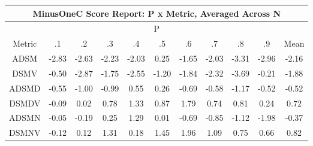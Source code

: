 \begin{longtable}{ | c || c | c | c | c | c | c | c | c | c || c |}
\hline
\multicolumn{11}{|c|}{ MinusOneC Score Report: P x Metric, Averaged Across N } \\
\hline
\multicolumn{11}{|c|}{ P } \\
\hline
Metric & .1 & .2 & .3 & .4 & .5 & .6 & .7 & .8 & .9 & Mean\\
\hline
\hline
\endhead
ADSM &  \cellcolor[HTML]{FFB7B7} -2.83 &  \cellcolor[HTML]{FFBFBF} -2.63 &  \cellcolor[HTML]{FFC7C7} -2.23 &  \cellcolor[HTML]{FFCFCF} -2.03 &  \cellcolor[HTML]{F7F7FF} 0.25 &  \cellcolor[HTML]{FFD7D7} -1.65 &  \cellcolor[HTML]{FFCFCF} -2.03 &  \cellcolor[HTML]{FFAFAF} -3.31 &  \cellcolor[HTML]{FFB7B7} -2.96 &  \cellcolor[HTML]{FFC7C7} -2.16 \\
DSMV &  \cellcolor[HTML]{FFEFEF} -0.50 &  \cellcolor[HTML]{FFB7B7} -2.87 &  \cellcolor[HTML]{FFCFCF} -1.75 &  \cellcolor[HTML]{FFBFBF} -2.55 &  \cellcolor[HTML]{FFDFDF} -1.20 &  \cellcolor[HTML]{FFCFCF} -1.84 &  \cellcolor[HTML]{FFC7C7} -2.32 &  \cellcolor[HTML]{FF9F9F} -3.69 &  \cellcolor[HTML]{FFF7F7} -0.21 &  \cellcolor[HTML]{FFCFCF} -1.88 \\
ADSMD &  \cellcolor[HTML]{FFEFEF} -0.55 &  \cellcolor[HTML]{FFE7E7} -1.00 &  \cellcolor[HTML]{FFE7E7} -0.99 &  \cellcolor[HTML]{EFEFFF} 0.55 &  \cellcolor[HTML]{F7F7FF} 0.26 &  \cellcolor[HTML]{FFEFEF} -0.69 &  \cellcolor[HTML]{FFEFEF} -0.58 &  \cellcolor[HTML]{FFDFDF} -1.17 &  \cellcolor[HTML]{FFEFEF} -0.52 &  \cellcolor[HTML]{FFEFEF} -0.52 \\
DSMDV &  \cellcolor[HTML]{FFFFFF} -0.09 &  \cellcolor[HTML]{FFFFFF} 0.02 &  \cellcolor[HTML]{EFEFFF} 0.78 &  \cellcolor[HTML]{DFDFFF} 1.33 &  \cellcolor[HTML]{E7E7FF} 0.87 &  \cellcolor[HTML]{CFCFFF} 1.79 &  \cellcolor[HTML]{EFEFFF} 0.74 &  \cellcolor[HTML]{E7E7FF} 0.81 &  \cellcolor[HTML]{F7F7FF} 0.24 &  \cellcolor[HTML]{EFEFFF} 0.72 \\
ADSMN &  \cellcolor[HTML]{FFFFFF} -0.05 &  \cellcolor[HTML]{FFF7F7} -0.19 &  \cellcolor[HTML]{F7F7FF} 0.25 &  \cellcolor[HTML]{DFDFFF} 1.29 &  \cellcolor[HTML]{FFFFFF} 0.01 &  \cellcolor[HTML]{FFEFEF} -0.69 &  \cellcolor[HTML]{FFE7E7} -0.85 &  \cellcolor[HTML]{FFDFDF} -1.12 &  \cellcolor[HTML]{FFCFCF} -1.98 &  \cellcolor[HTML]{FFF7F7} -0.37 \\
DSMNV &  \cellcolor[HTML]{FFFFFF} -0.12 &  \cellcolor[HTML]{FFFFFF} 0.12 &  \cellcolor[HTML]{DFDFFF} 1.31 &  \cellcolor[HTML]{F7F7FF} 0.18 &  \cellcolor[HTML]{D7D7FF} 1.45 &  \cellcolor[HTML]{CFCFFF} 1.96 &  \cellcolor[HTML]{E7E7FF} 1.09 &  \cellcolor[HTML]{EFEFFF} 0.75 &  \cellcolor[HTML]{EFEFFF} 0.66 &  \cellcolor[HTML]{E7E7FF} 0.82 \\

\end{longtable}
